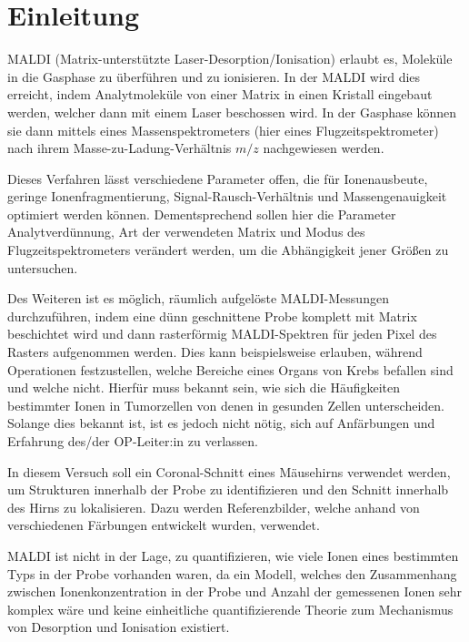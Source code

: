 \section{Einleitung}


  MALDI (Matrix-unterstützte Laser-Desorption/Ionisation) erlaubt es, Moleküle in die Gasphase zu überführen und zu ionisieren.
  In der MALDI wird dies erreicht, indem Analytmoleküle von einer Matrix in einen Kristall eingebaut werden, welcher dann mit einem Laser beschossen wird.
  In der Gasphase können sie dann mittels eines Massenspektrometers (hier eines Flugzeitspektrometer) nach ihrem Masse-zu-Ladung-Verhältnis $m/z$ nachgewiesen werden.

  Dieses Verfahren lässt verschiedene Parameter offen, die für Ionenausbeute, geringe Ionenfragmentierung, Signal-Rausch-Verhältnis und Massengenauigkeit optimiert werden können.
  Dementsprechend sollen hier die Parameter Analytverdünnung, Art der verwendeten Matrix und Modus des Flugzeitspektrometers verändert werden, um die Abhängigkeit jener Größen zu untersuchen.

  Des Weiteren ist es möglich, räumlich aufgelöste MALDI-Messungen durchzuführen, indem eine dünn geschnittene Probe komplett mit Matrix beschichtet wird und dann rasterförmig MALDI-Spektren für jeden Pixel des Rasters aufgenommen werden.
  Dies kann beispielsweise erlauben, während Operationen festzustellen, welche Bereiche eines Organs von Krebs befallen sind und welche nicht.
  Hierfür muss bekannt sein, wie sich die Häufigkeiten bestimmter Ionen in Tumorzellen von denen in gesunden Zellen unterscheiden.
  Solange dies bekannt ist, ist es jedoch nicht nötig, sich auf Anfärbungen und Erfahrung des/der OP-Leiter:in zu verlassen.

  In diesem Versuch soll ein Coronal-Schnitt eines Mäusehirns verwendet werden, um Strukturen innerhalb der Probe zu identifizieren und den Schnitt innerhalb des Hirns zu lokalisieren.
  Dazu werden Referenzbilder, welche anhand von verschiedenen Färbungen entwickelt wurden, verwendet.

  MALDI ist nicht in der Lage, zu quantifizieren, wie viele Ionen eines bestimmten Typs in der Probe vorhanden waren, da ein Modell, welches den Zusammenhang zwischen Ionenkonzentration in der Probe und Anzahl der gemessenen Ionen sehr komplex wäre und keine einheitliche quantifizierende Theorie zum Mechanismus von Desorption und Ionisation existiert.
